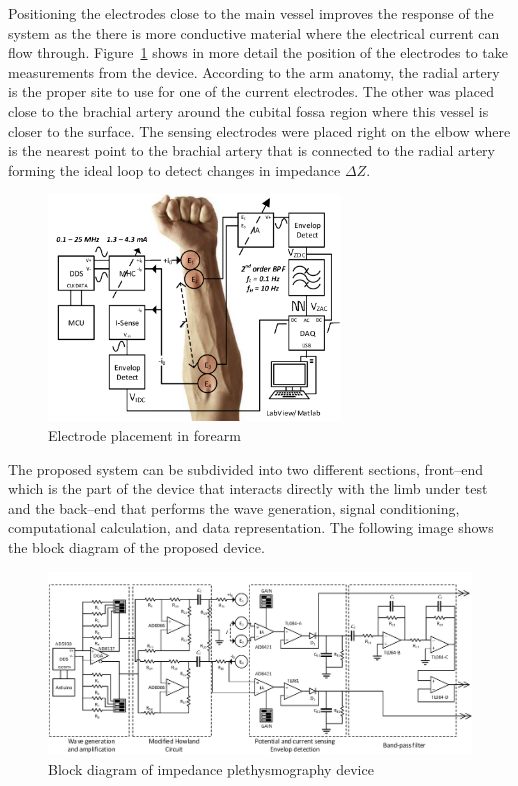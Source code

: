 Positioning the electrodes close to the main vessel improves the response of the system as the there is more conductive material where the electrical current can flow through. Figure~\ref{fig:electrode} shows in more detail the position of the electrodes to take measurements from the device. According to the arm anatomy, the radial artery is the proper site to use for one of the current electrodes. The other was placed close to the brachial artery around the cubital fossa region where this vessel is closer to the surface. The sensing electrodes were placed right on the elbow where is the nearest point to the brachial artery that is connected to the radial artery forming the ideal loop to detect changes in impedance $\Delta Z$.  

\begin{figure}[!htpb]
	\centering
	\includegraphics[width=7.75cm,keepaspectratio]{figure1}	
    \caption{Electrode placement in forearm}
    \label{fig:electrode}
\end{figure}

The proposed system can be subdivided into two different sections, front–end which is the part of the device that interacts directly with the limb under test and the back–end that performs the wave generation, signal conditioning, computational calculation, and data representation. The following image shows the block diagram of the proposed device.

\begin{figure}[!htpb]
	\centering
	\includegraphics[width=\textwidth,keepaspectratio]{figure2}
    \caption{Block diagram of impedance plethysmography device}
    \label{fig:block}
\end{figure}

